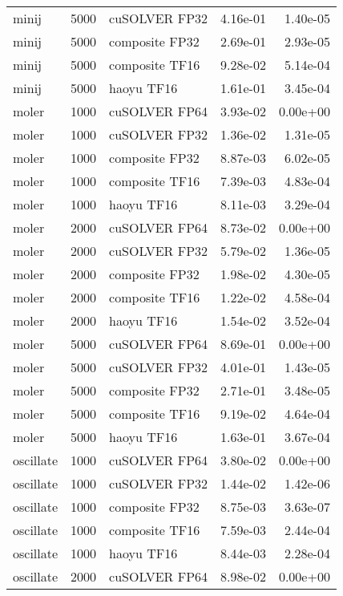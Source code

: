 \begin{table}
\begin{tabular}{lrlrr}
    minij &  5000 &  cuSOLVER FP32 &  4.16e-01 &        1.40e-05 \\
    minij &  5000 & composite FP32 &  2.69e-01 &        2.93e-05 \\
    minij &  5000 & composite TF16 &  9.28e-02 &        5.14e-04 \\
    minij &  5000 &     haoyu TF16 &  1.61e-01 &        3.45e-04 \\
    moler &  1000 &  cuSOLVER FP64 &  3.93e-02 &        0.00e+00 \\
    moler &  1000 &  cuSOLVER FP32 &  1.36e-02 &        1.31e-05 \\
    moler &  1000 & composite FP32 &  8.87e-03 &        6.02e-05 \\
    moler &  1000 & composite TF16 &  7.39e-03 &        4.83e-04 \\
    moler &  1000 &     haoyu TF16 &  8.11e-03 &        3.29e-04 \\
    moler &  2000 &  cuSOLVER FP64 &  8.73e-02 &        0.00e+00 \\
    moler &  2000 &  cuSOLVER FP32 &  5.79e-02 &        1.36e-05 \\
    moler &  2000 & composite FP32 &  1.98e-02 &        4.30e-05 \\
    moler &  2000 & composite TF16 &  1.22e-02 &        4.58e-04 \\
    moler &  2000 &     haoyu TF16 &  1.54e-02 &        3.52e-04 \\
    moler &  5000 &  cuSOLVER FP64 &  8.69e-01 &        0.00e+00 \\
    moler &  5000 &  cuSOLVER FP32 &  4.01e-01 &        1.43e-05 \\
    moler &  5000 & composite FP32 &  2.71e-01 &        3.48e-05 \\
    moler &  5000 & composite TF16 &  9.19e-02 &        4.64e-04 \\
    moler &  5000 &     haoyu TF16 &  1.63e-01 &        3.67e-04 \\
oscillate &  1000 &  cuSOLVER FP64 &  3.80e-02 &        0.00e+00 \\
oscillate &  1000 &  cuSOLVER FP32 &  1.44e-02 &        1.42e-06 \\
oscillate &  1000 & composite FP32 &  8.75e-03 &        3.63e-07 \\
oscillate &  1000 & composite TF16 &  7.59e-03 &        2.44e-04 \\
oscillate &  1000 &     haoyu TF16 &  8.44e-03 &        2.28e-04 \\
oscillate &  2000 &  cuSOLVER FP64 &  8.98e-02 &        0.00e+00 \\

\end{tabular}
\end{table}
